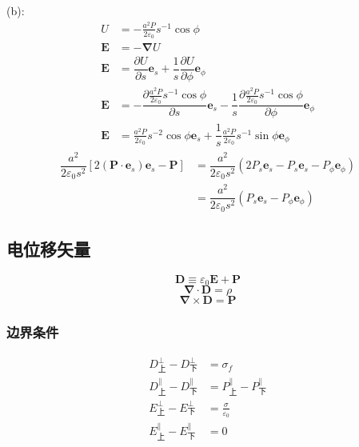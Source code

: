 (b):
\begin{align*}
    U&=-\frac{a^2P}{2\varepsilon_0}s^{-1}\cos\phi\\
    \boldsymbol{E}&=-\boldsymbol{\nabla}U\\
    \boldsymbol{E}&=\dfrac{\partial U}{\partial s}\boldsymbol{e}_s+\dfrac{1}{s}\dfrac{\partial U}{\partial \phi}\boldsymbol{e}_\phi\\
    \boldsymbol{E}&=-\dfrac{\partial \frac{a^2P}{2\varepsilon_0}s^{-1}\cos\phi}{\partial s}\boldsymbol{e}_s
    -\dfrac{1}{s}\dfrac{\partial \frac{a^2P}{2\varepsilon_0}s^{-1}\cos\phi}{\partial \phi}\boldsymbol{e}_\phi\\
    \boldsymbol{E}&=\frac{a^2P}{2\varepsilon_0}s^{-2}\cos\phi\boldsymbol{e}_s
    +\dfrac{1}{s}\frac{a^2P}{2\varepsilon_0}s^{-1}\sin\phi\boldsymbol{e}_\phi
\end{align*}
\begin{align*}
    \dfrac{a^2}{2\varepsilon_0s^2}[2(\boldsymbol{P}\cdot\boldsymbol{e}_s)\boldsymbol{e}_s-\boldsymbol{P}]
    &=\dfrac{a^2}{2\varepsilon_0s^2}(2P_s\boldsymbol{e}_s-P_s\boldsymbol{e}_s-P_\phi\boldsymbol{e}_\phi)\\
    &=\dfrac{a^2}{2\varepsilon_0s^2}(P_s\boldsymbol{e}_s-P_\phi\boldsymbol{e}_\phi)
\end{align*}
\subsection{电位移矢量}
\begin{equation}
    \boldsymbol{D}\equiv\varepsilon_0\boldsymbol{E}+\boldsymbol{P}
\end{equation}
\begin{equation}
    \boldsymbol{\nabla}\cdot\boldsymbol{D}=\rho
\end{equation}
\begin{equation}
    \boldsymbol{\nabla}\times\boldsymbol{D}=\boldsymbol{P}
\end{equation}
\subsubsection{边界条件}
\begin{align}
    D_{\text{上}}^\bot -D_{\text{下}}^\bot&=\sigma_f\\
D_{\text{上}}^{\parallel} -D_{\text{下}}^{\parallel}&=P_{\text{上}}^{\parallel} -P_{\text{下}}^{\parallel}\\
E_{\text{上}}^\bot -E_{\text{下}}^\bot&=\frac{\sigma}{\varepsilon_0}\\
E_{\text{上}}^{\parallel} -E_{\text{下}}^{\parallel}&=0
\end{align}
